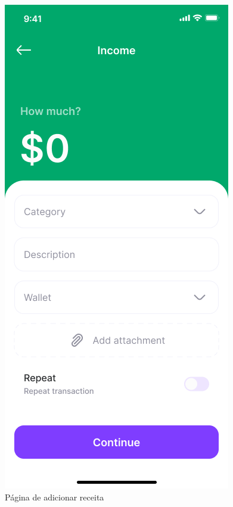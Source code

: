 \begin{figure}[!htb]
    \centering
    \caption{Página de adicionar receita}
    \includegraphics[scale=0.3]{images/income.png}
\end{figure}

